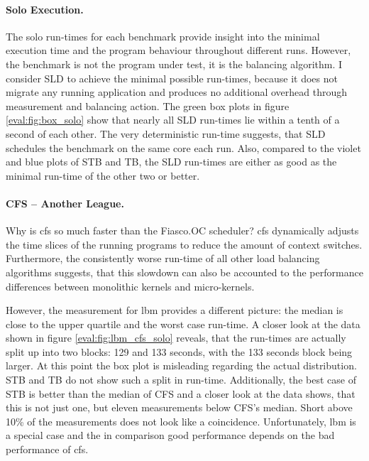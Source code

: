 \paragraph{Solo Execution.}
The solo run-times for each benchmark provide insight into the minimal
execution time and the program behaviour throughout different runs.
However, the benchmark is not the program under test, it is the balancing
algorithm.
I consider SLD to achieve the minimal possible run-times, because it does not
migrate any running application and produces no additional overhead through
measurement and balancing action.
The green box plots in figure \ref{eval:fig:box_solo} show that nearly all SLD
run-times lie within a tenth of a second of each other.
The very deterministic run-time suggests, that SLD schedules the benchmark on
the same core each run.
Also, compared to the violet and blue plots of STB and TB, the SLD run-times
are either as good as the minimal run-time of the other two or better.



\paragraph{CFS -- Another League.}
Why is \gls{cfs} so much faster than the Fiasco.OC scheduler?
\Gls{cfs} dynamically adjusts the time slices of the running programs to reduce
the amount of context switches.
Furthermore, the consistently worse run-time of all other load balancing
algorithms suggests, that this slowdown can also be accounted to the performance
differences between monolithic kernels and micro-kernels.

However, the measurement for lbm provides a different picture:
the median is close to the upper quartile and the worst case run-time.
A closer look at the data shown in figure \ref{eval:fig:lbm_cfs_solo} reveals,
that the run-times are actually split up into two blocks: 129 and 133 seconds,
with the 133 seconds block being larger.
At this point the box plot is misleading regarding the actual distribution.
STB and TB do not show such a split in run-time.
Additionally, the best case of STB is better than the median of CFS and a closer look
at the data shows, that this is not just one, but eleven measurements below
CFS's median.
Short above 10\% of the measurements does not look like a coincidence.
Unfortunately, lbm is a special case and the in comparison good performance
depends on the bad performance of \gls{cfs}.

